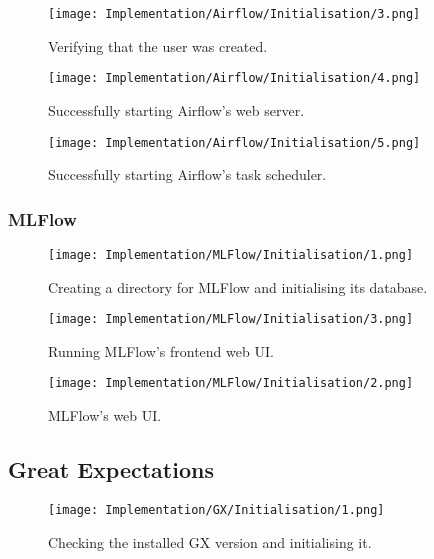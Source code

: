 \begin{figure}[H]
    \centering
    \texttt{[image: Implementation/Airflow/Initialisation/3.png]}
    \caption{Verifying that the user was created.}
    \label{fig:AirflowUser2}
\end{figure}

\begin{figure}[H]
    \centering
    \texttt{[image: Implementation/Airflow/Initialisation/4.png]}
    \caption{Successfully starting Airflow's web server.}
    \label{fig:AirflowWebserver}
\end{figure}

\begin{figure}[H]
    \centering
    \texttt{[image: Implementation/Airflow/Initialisation/5.png]}
    \caption{Successfully starting Airflow's task scheduler.}
    \label{fig:AirflowScheduler}
\end{figure}

\subsubsection{MLFlow}

\begin{figure}[H]
    \centering
    \texttt{[image: Implementation/MLFlow/Initialisation/1.png]}
    \caption{Creating a directory for MLFlow and initialising its database.}
    \label{fig:MLFlowInit}
\end{figure}

\begin{figure}[H]
    \centering
    \texttt{[image: Implementation/MLFlow/Initialisation/3.png]}
    \caption{Running MLFlow's frontend web UI.}
    \label{fig:MLFlowUICmd}
\end{figure}

\begin{figure}[H]
    \centering
    \texttt{[image: Implementation/MLFlow/Initialisation/2.png]}
    \caption{MLFlow's web UI.}
    \label{fig:MLFlowEmptyUI}
\end{figure}

\subsection{Great Expectations}

\begin{figure}[H]
    \centering
    \texttt{[image: Implementation/GX/Initialisation/1.png]}
    \caption{Checking the installed GX version and initialising it.}
    \label{fig:GXVersion}
\end{figure}

